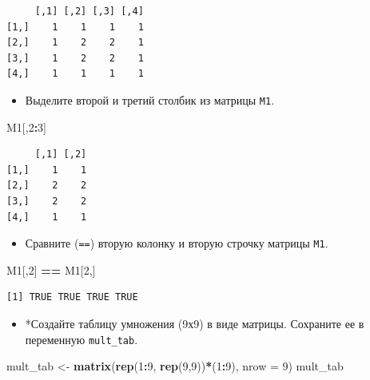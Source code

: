 \documentclass[
]{book}
\newenvironment{Shaded}{\begin{snugshade}}{\end{snugshade}}
\newcommand{\DataTypeTok}[1]{\textcolor[rgb]{0.13,0.29,0.53}{#1}}
\newcommand{\DecValTok}[1]{\textcolor[rgb]{0.00,0.00,0.81}{#1}}
\newcommand{\KeywordTok}[1]{\textcolor[rgb]{0.13,0.29,0.53}{\textbf{#1}}}
\newcommand{\NormalTok}[1]{#1}
\newcommand{\OperatorTok}[1]{\textcolor[rgb]{0.81,0.36,0.00}{\textbf{#1}}}
\newcommand{\StringTok}[1]{\textcolor[rgb]{0.31,0.60,0.02}{#1}}
\providecommand{\tightlist}{%
  \setlength{\itemsep}{0pt}\setlength{\parskip}{0pt}}
\begin{document}
\begin{verbatim}
     [,1] [,2] [,3] [,4]
[1,]    1    1    1    1
[2,]    1    2    2    1
[3,]    1    2    2    1
[4,]    1    1    1    1
\end{verbatim}

\begin{itemize}
\tightlist
\item
  Выделите второй и третий столбик из матрицы \texttt{M1}.
\end{itemize}

\begin{Shaded}
\begin{Highlighting}[]
\NormalTok{M1[,}\DecValTok{2}\OperatorTok{:}\DecValTok{3}\NormalTok{]}
\end{Highlighting}
\end{Shaded}

\begin{verbatim}
     [,1] [,2]
[1,]    1    1
[2,]    2    2
[3,]    2    2
[4,]    1    1
\end{verbatim}

\begin{itemize}
\tightlist
\item
  Сравните (\texttt{==}) вторую колонку и вторую строчку матрицы \texttt{M1}.
\end{itemize}

\begin{Shaded}
\begin{Highlighting}[]
\NormalTok{M1[,}\DecValTok{2}\NormalTok{] }\OperatorTok{==}\StringTok{ }\NormalTok{M1[}\DecValTok{2}\NormalTok{,]}
\end{Highlighting}
\end{Shaded}

\begin{verbatim}
[1] TRUE TRUE TRUE TRUE
\end{verbatim}

\begin{itemize}
\tightlist
\item
  *Создайте таблицу умножения (9х9) в виде матрицы. Сохраните ее в переменную \texttt{mult\_tab}.
\end{itemize}

\begin{Shaded}
\begin{Highlighting}[]
\NormalTok{mult_tab <-}\StringTok{ }\KeywordTok{matrix}\NormalTok{(}\KeywordTok{rep}\NormalTok{(}\DecValTok{1}\OperatorTok{:}\DecValTok{9}\NormalTok{, }\KeywordTok{rep}\NormalTok{(}\DecValTok{9}\NormalTok{,}\DecValTok{9}\NormalTok{))}\OperatorTok{*}\NormalTok{(}\DecValTok{1}\OperatorTok{:}\DecValTok{9}\NormalTok{), }\DataTypeTok{nrow =} \DecValTok{9}\NormalTok{)}
\NormalTok{mult_tab}
\end{Highlighting}
\end{Shaded}
\end{document}
